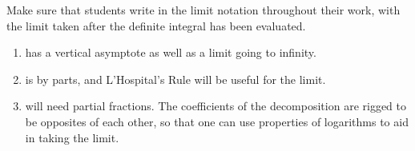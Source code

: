 \documentclass[noinstructornotes]{ximera}
\begin{document}
\begin{problem}
	
	
\end{problem}

\begin{instructorNotes}
Make sure that students write in the limit notation throughout their work, with the limit taken after the definite integral has been evaluated.
	\begin{enumerate}
	\item has a vertical asymptote as well as a limit going to infinity.
	\item is by parts, and L'Hospital's Rule will be useful for the limit.
	\item will need partial fractions.  
	The coefficients of the decomposition are rigged to be opposites of each other, so that one can use properties of logarithms to aid in taking the limit.
	\end{enumerate}
\end{instructorNotes}







%
%
%
\end{document}

